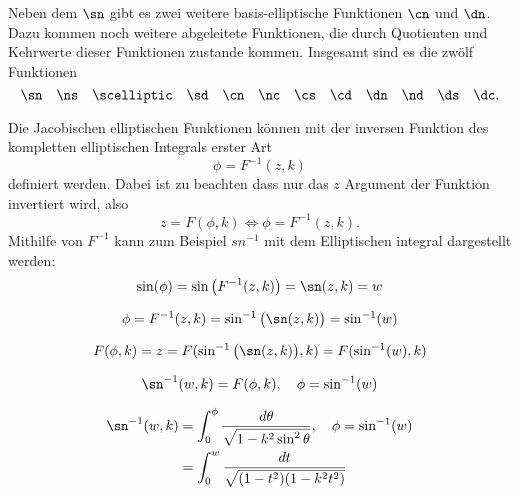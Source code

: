 \begin{refsection}
Neben dem $\sn$ gibt es zwei weitere basis-elliptische Funktionen $\cn$ und $\dn$.
Dazu kommen noch weitere abgeleitete Funktionen, die durch Quotienten und Kehrwerte dieser Funktionen zustande kommen.
Insgesamt sind es die zwölf Funktionen
\begin{equation*}
    \sn \quad
    \ns \quad
    \scelliptic \quad
    \sd \quad
    \cn \quad
    \nc \quad
    \cs \quad
    \cd \quad
    \dn \quad
    \nd \quad
    \ds \quad
    \dc.
\end{equation*}

Die Jacobischen elliptischen Funktionen können mit der inversen Funktion des kompletten elliptischen Integrals erster Art
\begin{equation}
    \phi = F^{-1}(z, k)
\end{equation}
definiert werden. Dabei ist zu beachten dass nur das $z$ Argument der Funktion invertiert wird, also
\begin{equation}
    z = F(\phi, k)
    \Leftrightarrow
    \phi = F^{-1}(z, k).
\end{equation}
Mithilfe von $F^{-1}$ kann zum Beispiel $sn^{-1}$ mit dem Elliptischen integral dargestellt werden:
\begin{equation}
    \sin(\phi)
    =
    \sin \left( F^{-1}(z, k) \right)
    =
    \sn(z, k)
    =
    w
\end{equation}

\begin{equation}
    \phi
    =
     F^{-1}(z, k)
     =
     \sin^{-1} \big( \sn (z, k ) \big)
     =
    \sin^{-1} ( w )
\end{equation}

\begin{equation}
    F(\phi, k)
    =
    z
    =
    F( \sin^{-1} \big( \sn (z, k ) \big) , k)
    =
    F( \sin^{-1} ( w ), k)
\end{equation}

\begin{equation}
    \sn^{-1}(w, k)
    =
    F(\phi, k),
    \quad
    \phi = \sin^{-1}(w)
\end{equation}

\begin{align}
    \sn^{-1}(w, k)
        & =
    \int_{0}^{\phi}
    \frac{
        d\theta
    }{
        \sqrt{
            1-k^2 \sin^2 \theta
        }
    },
    \quad
    \phi = \sin^{-1}(w)
    \\
        & =
    \int_{0}^{w}
    \frac{
        dt
    }{
        \sqrt{
            (1-t^2)(1-k^2 t^2)
        }
    }
\end{align}


\end{refsection}
